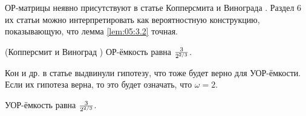 ОР-матрицы неявно присутствуют в статье Копперсмита и Винограда \cite{Coppersmith:1990}. Раздел 6 их статьи можно интерпретировать как вероятностную конструкцию, показывающую, что лемма \ref{lem:05:3.2} точная.

\begin{theorem} (Копперсмит и Виноград \cite{Coppersmith:1990}) \label{th:05:3.3}
  ОР-ёмкость равна ${3 \over 2^{2 / 3}}$.
\end{theorem}

Кон и др. в статье \cite{Cohn05} выдвинули гипотезу, что тоже будет верно для УОР-ёмкости. Если их гипотеза верна, то это будет означать, что $\omega=2$.
\begin{conj} \label{conj:05:3.4}
  УОР-ёмкость равна ${3 \over 2^{2 / 3}}$.
\end{conj}














